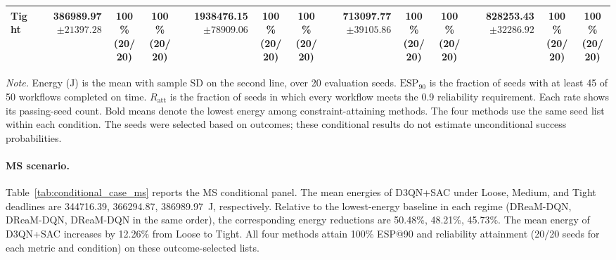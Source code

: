 \begin{table}[!t]
\begin{tabular}{@{}l*{4}{rcc}@{}}
Tight & \shortstack[r]{\textbf{386989.97}\\$\pm 21397.28$} & \shortstack[c]{100\%\\(20/20)} & \shortstack[c]{100\%\\(20/20)} & \shortstack[r]{1938476.15\\$\pm 78909.06$} & \shortstack[c]{100\%\\(20/20)} & \shortstack[c]{100\%\\(20/20)} & \shortstack[r]{713097.77\\$\pm 39105.86$} & \shortstack[c]{100\%\\(20/20)} & \shortstack[c]{100\%\\(20/20)} & \shortstack[r]{828253.43\\$\pm 32286.92$} & \shortstack[c]{100\%\\(20/20)} & \shortstack[c]{100\%\\(20/20)} \\
\bottomrule
\end{tabular}
\par\vspace{3pt}
\parbox{\textwidth}{\footnotesize
\textit{Note.} Energy (J) is the mean with sample SD on the second line, over 20 evaluation seeds.
$\mathrm{ESP}_{90}$ is the fraction of seeds with at least 45 of 50 workflows completed on time.
$R_{\mathrm{att}}$ is the fraction of seeds in which every workflow meets the 0.9 reliability requirement.
Each rate shows its passing-seed count. Bold means denote the lowest energy among constraint-attaining methods.
The four methods use the same seed list within each condition.
The seeds were selected based on outcomes; these conditional results do not estimate unconditional success probabilities.}
\endgroup
\end{table}

\paragraph{MS scenario.}
Table~\ref{tab:conditional_case_ms} reports the MS conditional panel. The mean energies of D3QN+SAC under Loose, Medium, and Tight deadlines are 344716.39, 366294.87, 386989.97~J, respectively. Relative to the lowest-energy baseline in each regime (DReaM-DQN, DReaM-DQN, DReaM-DQN in the same order), the corresponding energy reductions are 50.48\%, 48.21\%, 45.73\%. The mean energy of D3QN+SAC increases by 12.26\% from Loose to Tight. All four methods attain 100\% ESP@90 and reliability attainment (20/20 seeds for each metric and condition) on these outcome-selected lists.

